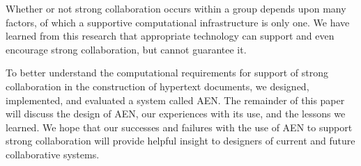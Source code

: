 Whether or not strong collaboration occurs within a group depends upon many
factors, of which a supportive computational infrastructure is only
one.  We have learned from this research that appropriate technology can
support and even encourage strong collaboration, but cannot guarantee it.

To better understand the computational requirements for support of strong collaboration
in the construction of hypertext documents, we designed, implemented, and 
evaluated a system
called AEN.  The remainder
of this paper will discuss the design of AEN, our experiences with its use,
and the lessons we learned.  We hope that our successes and failures with
the use of AEN to support strong collaboration will provide helpful insight
to designers of current and future collaborative systems.















